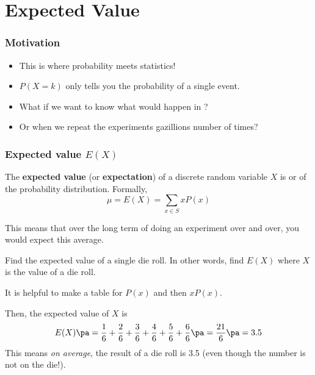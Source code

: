 \section[Expected]{Expected Value}
\frame{\sectionpage}

\begin{frame}
\frametitle{Motivation}
\begin{itemize}
\item This is where probability meets statistics! \pa
\item $P(X=k)$ only tells you the probability of a single event. \pa
\item What if we want to know what would happen in ? \pa
\item Or when we repeat the experiments gazillions number of times?
\end{itemize}
\end{frame}

\begin{frame}
\frametitle{Expected value $E(X)$}
\begin{defn}{}{}
The \textbf{expected value} (or \textbf{expectation}) \pa of a discrete random variable $X$ is  or  of the probability distribution. Formally,
\[ \mu = E(X) = \sum_{x \in S} x P(x)\] \pa
\end{defn}
This means that over the long term of doing an experiment over and over, you would expect this average.
\end{frame}


\begin{frame}[t]
\begin{ex}
Find the expected value of a single die roll. In other words, find $E(X)$ where $X$ is the value of a die roll.
\end{ex}
\begin{sol}
It is helpful to make a table for $P(x)$ and then $x P(x)$.
\begin{table}[h!]
\end{table}

Then, the expected value of $X$ is 
\[E(X) \pa= \frac{1}{6} + \frac{2}{6} + \frac{3}{6} + \frac{4}{6} + \frac{5}{6} + \frac{6}{6} \pa = \frac{21}{6} \pa = 3.5\]
This means \textit{on average}, the result of a die roll is 3.5 (even though the number is not on the die!). \pa
\end{sol}
\end{frame}


